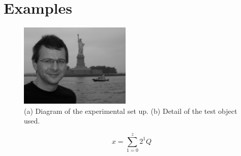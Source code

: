 \documentclass[11pt]{IEEEtran}
\begin{document}


\nocite{*}

\section{Examples}

\begin{figure}[t]
\centering
\includegraphics[width=200px]{figures/julian-harty.eps}
\caption{(a) Diagram of the experimental set up. (b) Detail of the test object used.}
\label{fig_env1}
\end{figure}

\begin{equation}
x=\sum\limits_{1=0}^z 2^1Q
\label{eq1}
\end{equation}%
\end{document}
